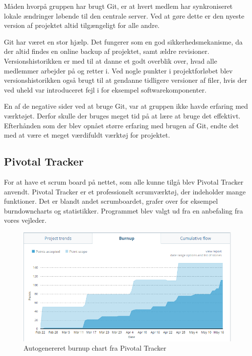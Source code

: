 \noindent Måden hvorpå gruppen har brugt Git, er at hvert medlem har synkroniseret lokale ændringer løbende til den centrale server. Ved at gøre dette er den nyeste version af projektet altid tilgængeligt for alle andre. \newline

\noindent Git har været en stor hjælp. Det fungerer som en god sikkerhedsmekanisme, da der altid findes en online backup af projektet, samt ældre revisioner. Versionshistorikken er med til at danne et godt overblik over, hvad alle medlemmer arbejder på og retter i. Ved nogle punkter i projektforløbet blev versionshistorikken også brugt til at gendanne tidligere versioner af filer, hvis der ved uheld var introduceret fejl i for eksempel softwarekomponenter. \newline

\noindent En af de negative sider ved at bruge Git, var at gruppen ikke havde erfaring med værktøjet. Derfor skulle der bruges meget tid på at lære at bruge det effektivt. Efterhånden som der blev opnået større erfaring med brugen af Git, endte det med at være et meget værdifuldt værktøj for projektet.  

\subsection{Pivotal Tracker}
\label{section:pivotalTracker}
For at have et scrum board på nettet, som alle kunne tilgå blev Pivotal Tracker \cite{pivotalTracker} anvendt. Pivotal Tracker er et professionelt scrumværktøj, der indeholder mange funktioner. Det er blandt andet scrumboardet, grafer over for eksempel burndowncharts og statistikker. Programmet blev valgt ud fra en anbefaling fra vores vejleder.

\begin{figure}[H]
	\centering
	\includegraphics[width=\textwidth]{Projektgennemfoerelse/images/burnupchart}
	\caption{Autogenereret burnup chart fra Pivotal Tracker}
	\label{fig:burnup}
\end{figure}

